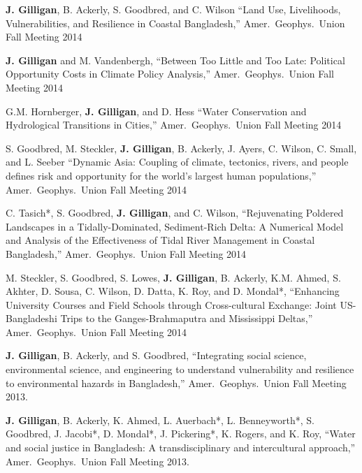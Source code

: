 %
%
    \item \textbf{J. Gilligan}, B. Ackerly, S. Goodbred, and C. Wilson
    \enquote{Land Use, Livelihoods, Vulnerabilities, and Resilience in Coastal Bangladesh,}
    Amer.\ Geophys.\ Union Fall Meeting 2014

    \item \textbf{J. Gilligan} and M. Vandenbergh,    
    \enquote{Between Too Little and Too Late: Political Opportunity Costs in Climate Policy Analysis,}
    Amer.\ Geophys.\ Union Fall Meeting 2014

    \item G.M. Hornberger, \textbf{J. Gilligan}, and D. Hess
    \enquote{Water Conservation and Hydrological Transitions in Cities,}
    Amer.\ Geophys.\ Union Fall Meeting 2014

    \item S. Goodbred, M. Steckler, \textbf{J. Gilligan}, B. Ackerly, J. Ayers, C. Wilson, C. Small, and L. Seeber
    \enquote{Dynamic Asia: Coupling of climate, tectonics, rivers, and people defines risk and opportunity for the world’s largest human populations,}
    Amer.\ Geophys.\ Union Fall Meeting 2014

    \item C. Tasich*, S. Goodbred, \textbf{J. Gilligan}, and C. Wilson,
    \enquote{Rejuvenating Poldered Landscapes in a Tidally-Dominated, Sediment-Rich Delta: A Numerical Model and Analysis of the Effectiveness of Tidal River Management in Coastal Bangladesh,}
    Amer.\ Geophys.\ Union Fall Meeting 2014
    
    \item M. Steckler, S. Goodbred, S. Lowes, \textbf{J. Gilligan}, B. Ackerly, K.M. Ahmed, S. Akhter, D. Sousa, C. Wilson, D. Datta, K. Roy, and D. Mondal*,
    \enquote{Enhancing University Courses and Field Schools through Cross-cultural Exchange: Joint US-Bangladeshi Trips to the Ganges-Brahmaputra and Mississippi Deltas,}
    Amer.\ Geophys.\ Union Fall Meeting 2014

    \item \textbf{J. Gilligan}, B. Ackerly, and S. Goodbred,
    \enquote{Integrating social science, environmental science, and engineering to understand vulnerability and resilience to environmental hazards in Bangladesh,}
    Amer.\ Geophys.\ Union Fall Meeting 2013.
    
    \item \textbf{J. Gilligan}, B. Ackerly, K. Ahmed, L. Auerbach*, L. Benneyworth*, S. Goodbred, J. Jacobi*,  D. Mondal*, J. Pickering*, K. Rogers, and K. Roy,
    \enquote{Water and social justice in Bangladesh: A transdisciplinary and intercultural approach,}
    Amer.\ Geophys.\ Union Fall Meeting 2013.
    
